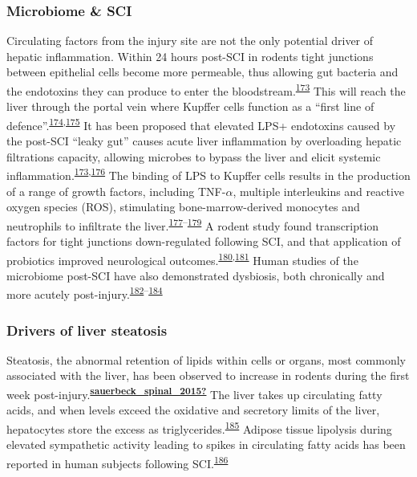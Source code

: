\documentclass[
]{article}
\begin{document}
\hypertarget{microbiome-sci}{%
\subsubsection{Microbiome \& SCI}\label{microbiome-sci}}

Circulating factors from the injury site are not the only potential driver of hepatic inflammation.
Within 24 hours post-SCI in rodents tight junctions between epithelial cells become more permeable, thus allowing gut bacteria and the endotoxins they can produce to enter the bloodstream.\textsuperscript{\protect\hyperlink{ref-liu_study_2004}{173}}
This will reach the liver through the portal vein where Kupffer cells function as a ``first line of defence''.\textsuperscript{\protect\hyperlink{ref-jenne_immune_2013}{174},\protect\hyperlink{ref-balmer_liver_2014}{175}}
It has been proposed that elevated LPS+ endotoxins caused by the post-SCI ``leaky gut'' causes acute liver inflammation by overloading hepatic filtrations capacity, allowing microbes to bypass the liver and elicit systemic inflammation.\textsuperscript{\protect\hyperlink{ref-liu_study_2004}{173},\protect\hyperlink{ref-oconnor_investigation_2018}{176}}
The binding of LPS to Kupffer cells results in the production of a range of growth factors, including TNF-\(\alpha\), multiple interleukins and reactive oxygen species (ROS), stimulating bone-marrow-derived monocytes and neutrophils to infiltrate the liver.\textsuperscript{\protect\hyperlink{ref-myers_following_2019}{177}--\protect\hyperlink{ref-kazankov_role_2019}{179}}
A rodent study found transcription factors for tight junctions down-regulated following SCI, and that application of probiotics improved neurological outcomes.\textsuperscript{\protect\hyperlink{ref-kigerl_gut_2018}{180},\protect\hyperlink{ref-kigerl_gut_2016}{181}}
Human studies of the microbiome post-SCI have also demonstrated dysbiosis, both chronically and more acutely post-injury.\textsuperscript{\protect\hyperlink{ref-zhang_gut_2018}{182}--\protect\hyperlink{ref-bazzocchi_changes_2021}{184}}

\hypertarget{drivers-of-liver-steatosis}{%
\subsubsection{Drivers of liver steatosis}\label{drivers-of-liver-steatosis}}

Steatosis, the abnormal retention of lipids within cells or organs, most commonly associated with the liver, has been observed to increase in rodents during the first week post-injury.\textsuperscript{\protect\hyperlink{ref-sauerbeck_spinal_2015}{\textbf{sauerbeck\_spinal\_2015?}}}
The liver takes up circulating fatty acids, and when levels exceed the oxidative and secretory limits of the liver, hepatocytes store the excess as triglycerides.\textsuperscript{\protect\hyperlink{ref-diraison_role_1998}{185}}
Adipose tissue lipolysis during elevated sympathetic activity leading to spikes in circulating fatty acids has been reported in human subjects following SCI.\textsuperscript{\protect\hyperlink{ref-karlsson_insulin_1999}{186}}
\end{document}
